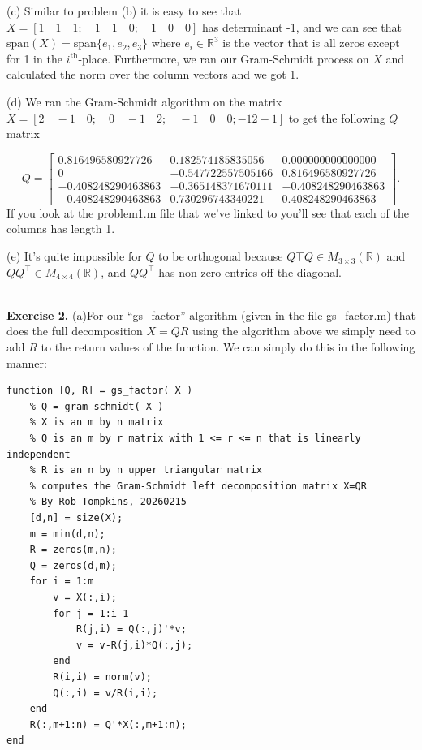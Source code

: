\documentclass[12pt]{amsart}
\begin{document}
\begin{onehalfspace}
        (c) Similar to problem (b) it is easy to see that $X = [1\quad 1\quad 1;\quad 1\quad 1\quad 0; \quad 1\quad 0\quad 0]$ has determinant -1, and we
        can see that $\text{span}(X) = \text{span}\{e_1,e_2,e_3\}$ where $e_i\in\mathbb{R}^3$ is the vector that is all zeros except for 1 in the $i^{\text{th}}$-place.
        Furthermore, we ran our Gram-Schmidt process on $X$ and calculated the norm over the column vectors and we got 1.

        (d) We ran the Gram-Schmidt algorithm on the matrix $X = [2\quad -1\quad 0;\quad 0\quad -1\quad 2; \quad -1\quad 0\quad 0; -1 2 -1]$ to get the following $Q$
        matrix

        \begin{displaymath}
            Q = \left[\begin{matrix}
                          0.816496580927726 & 0.182574185835056 & 0.000000000000000\\
                          0 & -0.547722557505166  & 0.816496580927726 \\
                          -0.408248290463863 & -0.365148371670111 & -0.408248290463863\\
                          -0.408248290463863 &  0.730296743340221 &  0.408248290463863
            \end{matrix}\right].
        \end{displaymath}
        If you look at the problem1.m file that we've linked to you'll see that each of the columns has length 1.

        (e) It's quite impossible for $Q$ to be orthogonal because $Q\top Q\in M_{3\times 3}(\mathbb{R})$ and
        $QQ^\top\in M_{4\times 4}(\mathbb{R})$, and $QQ^\top$ has non-zero entries off the diagonal.

\qquad\\
        \textbf{Exercise 2.} (a)For our ``gs\_factor'' algorithm (given in the file
        \href{https://github.com/chtompki/MathSpring2026/blob/main/NumericalAnalysis/GuidedLab2/gs_factor.m}{gs\_factor.m})
        that does the full decomposition $X=QR$ using the algorithm above
        we simply need to add $R$ to the return values of the function. We can simply do this in the following manner:
        \begin{tiny}
        \begin{verbatim}
function [Q, R] = gs_factor( X )
    % Q = gram_schmidt( X )
    % X is an m by n matrix
    % Q is an m by r matrix with 1 <= r <= n that is linearly independent
    % R is an n by n upper triangular matrix
    % computes the Gram-Schmidt left decomposition matrix X=QR
    % By Rob Tompkins, 20260215
    [d,n] = size(X);
    m = min(d,n);
    R = zeros(m,n);
    Q = zeros(d,m);
    for i = 1:m
        v = X(:,i);
        for j = 1:i-1
            R(j,i) = Q(:,j)'*v;
            v = v-R(j,i)*Q(:,j);
        end
        R(i,i) = norm(v);
        Q(:,i) = v/R(i,i);
    end
    R(:,m+1:n) = Q'*X(:,m+1:n);
end
        \end{verbatim}
        \end{tiny}


\end{onehalfspace}
\end{document}
